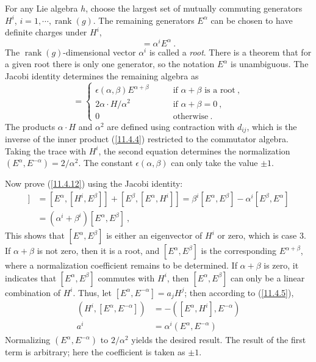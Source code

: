 For any Lie algebra $h$, choose the largest set of mutually commuting generators $H^{i}$, $i=1,\cdots,\operatorname{rank}(g)$. The remaining generators $E^{\alpha}$ can be chosen to have definite charges under $H^{i}$,
\begin{equation}
	[H^{i},E^{\alpha}]=\alpha^{i}E^{\alpha} \:. \label{11.4.11}
\end{equation}
The $\operatorname{rank}(g)$-dimensional vector $\alpha^{i}$ is called a \emph{root}. There is a theorem that for a given root there is only one generator, so the notation $E^{\alpha}$ is unambiguous. The Jacobi identity determines the remaining algebra as
\begin{equation}
	[E^{\alpha},E^{\beta}] = 
	\begin{cases}
		\epsilon(\alpha,\beta) E^{\alpha+\beta} &\qquad \text{if }\alpha+\beta \text{ is a root} \:, \\
		2\alpha\cdot H/\alpha^{2} &\qquad \text{if }\alpha+\beta=0\:, \\
		0 &\qquad \text{otherwise} \:.
	\end{cases} \label{11.4.12}
\end{equation}
The products $\alpha\cdot H$ and $\alpha^{2}$ are defined using contraction with $d_{ij}$, which is the inverse of the inner product (\ref{11.4.4}) restricted to the commutator algebra. Taking the trace with $H^{i}$, the second equation determines the normalization $(E^{\alpha},E^{-\alpha})=2/\alpha^{2}$. The constant $\epsilon(\alpha,\beta)$ can only take the value $\pm1$.
\begin{tcolorbox}[breakable]
	Now prove (\ref{11.4.12}) using the Jacobi identity:
	\begin{align*}
		[H^{i},[E^{\alpha},E^{\beta}]] &= [E^{\alpha},[H^{i},E^{\beta}]] + [E^{\beta},[E^{\alpha},H^{i}]]
		= \beta^{i}[E^{\alpha},E^{\beta}] - \alpha^{i} [E^{\beta},E^{\alpha}] \\
		&= (\alpha^{i}+\beta^{i})[E^{\alpha},E^{\beta}] \:,
	\end{align*}
	This shows that $[E^{\alpha},E^{\beta}]$ is either an eigenvector of $H^{i}$ or zero, which is case 3. If $\alpha+\beta$ is not zero, then it is a root, and $[E^{\alpha},E^{\beta}]$ is the corresponding $E^{\alpha+\beta}$, where a normalization coefficient remains to be determined. If $\alpha+\beta$ is zero, it indicates that $[E^{\alpha},E^{\beta}]$ commutes with $H^{i}$, then $[E^{\alpha},E^{\beta}]$ can only be a linear combination of $H^{i}$. Thus, let $[E^{\alpha},E^{-\alpha}]= a_{j}H^{j}$; then according to (\ref{11.4.5}),
	\begin{align*}
		(H^{i},[E^{\alpha},E^{-\alpha}])&= -([E^{\alpha},H^{i}],E^{-\alpha}) \\
		a^{i} & = \alpha^{i}(E^{\alpha},E^{-\alpha}) 
	\end{align*}
	Normalizing $(E^{\alpha},E^{-\alpha})$ to $2/\alpha^{2}$ yields the desired result. The result of the first term is arbitrary; here the coefficient is taken as $\pm1$.
\end{tcolorbox}

